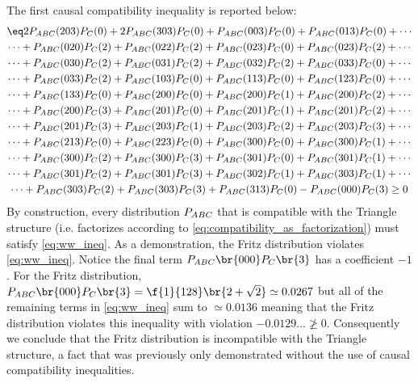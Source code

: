 \documentclass[aps, 10pt, english, twoside, pra, nofootinbib, tightenlines, longbibliography, superscriptaddress]{revtex4-1}
\begin{document}
    The first causal compatibility inequality is reported below:
    \begin{equation*}
    \begin{gathered}
    \eq\label{eq:ww_ineq}
    2P_{ABC}(203)P_{C}(0) + 2P_{ABC}(303)P_{C}(0) + P_{ABC}(003)P_{C}(0) + P_{ABC}(013)P_{C}(0) + \cdots \\
    \cdots + P_{ABC}(020)P_{C}(2) + P_{ABC}(022)P_{C}(2) + P_{ABC}(023)P_{C}(0) + P_{ABC}(023)P_{C}(2) + \cdots \\
    \cdots + P_{ABC}(030)P_{C}(2) + P_{ABC}(031)P_{C}(2) + P_{ABC}(032)P_{C}(2) + P_{ABC}(033)P_{C}(0) + \cdots \\
    \cdots + P_{ABC}(033)P_{C}(2) + P_{ABC}(103)P_{C}(0) + P_{ABC}(113)P_{C}(0) + P_{ABC}(123)P_{C}(0) + \cdots \\
    \cdots + P_{ABC}(133)P_{C}(0) + P_{ABC}(200)P_{C}(0) + P_{ABC}(200)P_{C}(1) + P_{ABC}(200)P_{C}(2) + \cdots \\
    \cdots + P_{ABC}(200)P_{C}(3) + P_{ABC}(201)P_{C}(0) + P_{ABC}(201)P_{C}(1) + P_{ABC}(201)P_{C}(2) + \cdots \\
    \cdots + P_{ABC}(201)P_{C}(3) + P_{ABC}(203)P_{C}(1) + P_{ABC}(203)P_{C}(2) + P_{ABC}(203)P_{C}(3) + \cdots \\
    \cdots + P_{ABC}(213)P_{C}(0) + P_{ABC}(223)P_{C}(0) + P_{ABC}(300)P_{C}(0) + P_{ABC}(300)P_{C}(1) + \cdots \\
    \cdots + P_{ABC}(300)P_{C}(2) + P_{ABC}(300)P_{C}(3) + P_{ABC}(301)P_{C}(0) + P_{ABC}(301)P_{C}(1) + \cdots \\
    \cdots + P_{ABC}(301)P_{C}(2) + P_{ABC}(301)P_{C}(3) + P_{ABC}(302)P_{C}(1) + P_{ABC}(303)P_{C}(1) + \cdots \\
    \cdots + P_{ABC}(303)P_{C}(2) + P_{ABC}(303)P_{C}(3) + P_{ABC}(313)P_{C}(0) - P_{ABC}(000)P_{C}(3) \geq 0
    \end{gathered}
    \end{equation*}
    By construction, every distribution $\prob[ABC]$ that is compatible with the Triangle structure (i.e. factorizes according to \cref{eq:compatibility_as_factorization}) must satisfy \cref{eq:ww_ineq}. As a demonstration, the Fritz distribution violates \cref{eq:ww_ineq}. Notice the final term $\prob[ABC]\br{000}\prob[C]\br{3}$ has a coefficient $-1$. For the Fritz distribution, $\prob[ABC]\br{000}\prob[C]\br{3} = \f{1}{128}\br{2 + \sqrt{2}} \simeq 0.0267$ but all of the remaining terms in \cref{eq:ww_ineq} sum to $\simeq 0.0136$ meaning that the Fritz distribution violates this inequality with violation $-0.0129\ldots \not \geq 0$. Consequently we conclude that the Fritz distribution is incompatible with the Triangle structure, a fact that was previously only demonstrated without the use of causal compatibility inequalities.
\end{document}
